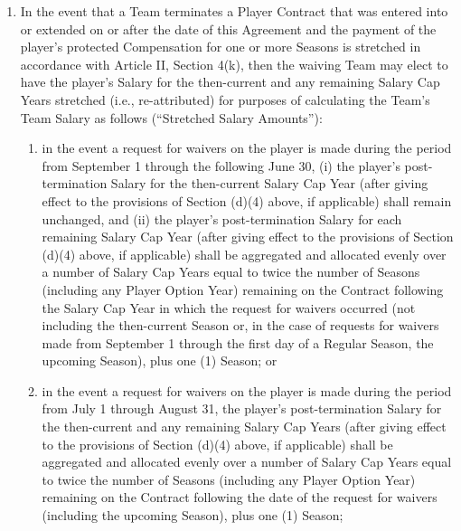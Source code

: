 \documentclass[
]{book}
\providecommand{\tightlist}{%
  \setlength{\itemsep}{0pt}\setlength{\parskip}{0pt}}
\begin{document}
\begin{enumerate}
\begin{enumerate}
  \item
    In the event that a Team terminates a Player Contract that was entered into or extended on or after the date of this Agreement and the payment of the player's protected Compensation for one or more Seasons is stretched in accordance with Article II, Section 4(k), then the waiving Team may elect to have the player's Salary for the then-current and any remaining Salary Cap Years stretched (i.e., re-attributed) for purposes of calculating the Team's Team Salary as follows (``Stretched Salary Amounts''):

    \begin{enumerate}
    \def\labelenumiii{(\Alph{enumiii})}
    \tightlist
    \item
      in the event a request for waivers on the player is made during the period from September 1 through the following June 30, (i) the player's post-termination Salary for the then-current Salary Cap Year (after giving effect to the provisions of Section (d)(4) above, if applicable) shall remain unchanged, and (ii) the player's post-termination Salary for each remaining Salary Cap Year (after giving effect to the provisions of Section (d)(4) above, if applicable) shall be aggregated and allocated evenly over a number of Salary Cap Years equal to twice the number of Seasons (including any Player Option Year) remaining on the Contract following the Salary Cap Year in which the request for waivers occurred (not including the then-current Season or, in the case of requests for waivers made from September 1 through the first day of a Regular Season, the upcoming Season), plus one (1) Season; or
    \item
      in the event a request for waivers on the player is made during the period from July 1 through August 31, the player's post-termination Salary for the then-current and any remaining Salary Cap Years (after giving effect to the provisions of Section (d)(4) above, if applicable) shall be aggregated and allocated evenly over a number of Salary Cap Years equal to twice the number of Seasons (including any Player Option Year) remaining on the Contract following the date of the request for waivers (including the upcoming Season), plus one (1) Season;
    \end{enumerate}


\end{enumerate}
\end{enumerate}
\end{document}
